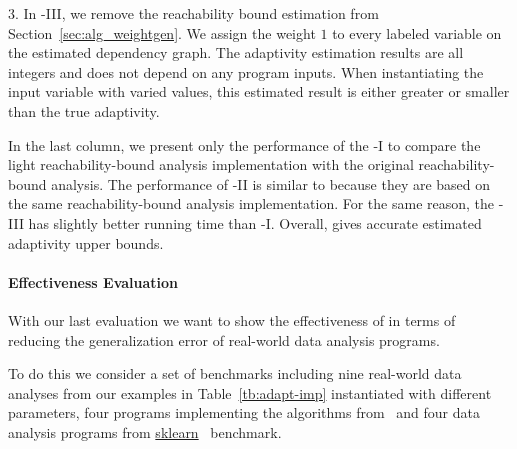 3. In {\THESYSTEM}-III, we remove the reachability bound estimation from Section~\ref{sec:alg_weightgen}.
We assign the weight $1$ to every labeled variable on the estimated dependency graph.
The adaptivity estimation results are all integers and does not depend on any program inputs.
When instantiating the input variable with varied values, this estimated result is either greater or smaller than the true adaptivity.

In the last column, we present only the performance of the {\THESYSTEM}-I to compare the
light reachability-bound analysis implementation with the original reachability-bound analysis.
The performance of {\THESYSTEM}-II is similar to {\THESYSTEM} because they are based on the same
reachability-bound analysis implementation. For the same reason, the {\THESYSTEM}-III has slightly better
running time than {\THESYSTEM}-I.
Overall, {\THESYSTEM} gives accurate estimated
adaptivity upper bounds.


\paragraph{Effectiveness Evaluation}

With our last evaluation we want to show the effectiveness of {\THESYSTEM} in terms of reducing the generalization error of real-world data analysis programs.

To do this we consider a set of benchmarks including 
nine real-world data analyses from our examples in Table~\ref{tb:adapt-imp} instantiated with different parameters,
four programs implementing the algorithms from~\cite{Jamieson2015TheAO}
and four data analysis programs 
from \hyperlink{https://github.com/scikit-learn/scikit-learn/tree/main/examples}{sklearn}~\cite{SklearnBenchmark} benchmark.

